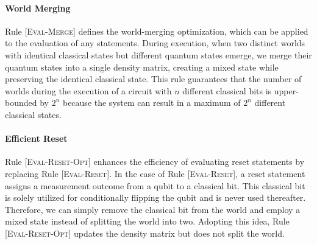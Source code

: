 \paragraph{World Merging}

Rule [\textsc{Eval-Merge}] defines the world-merging optimization, which can be
applied to the evaluation of any statements.
%
During execution, when two distinct worlds with identical classical states but
different quantum states emerge, we merge their quantum states into a single
density matrix, creating a mixed state while preserving the identical classical
state.
%
This rule guarantees that the number of worlds during the execution of a
circuit with $n$ different classical bits is upper-bounded by $2^n$ because the
system can result in a maximum of $2^n$ different classical states.

\paragraph{Efficient Reset}

Rule [\textsc{Eval-Reset-Opt}] enhances the efficiency of evaluating reset
statements by replacing Rule [\textsc{Eval-Reset}].
%
In the case of Rule [\textsc{Eval-Reset}], a reset statement assigns a
measurement outcome from a qubit to a classical bit.
%
This classical bit is solely utilized for conditionally flipping the qubit and
is never used thereafter.
%
Therefore, we can simply remove the classical bit from the world and employ a
mixed state instead of splitting the world into two.
%
Adopting this idea, Rule [\textsc{Eval-Reset-Opt}] updates the density matrix
but does not split the world.

